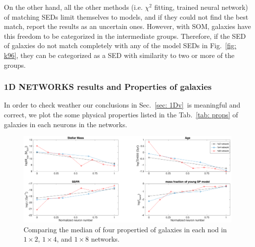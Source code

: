             On the other hand, all the other methods (i.e. $\chi^2$ fitting, trained neural network) of matching SEDs limit themselves to models, and if they could not find the best match, report the results as an uncertain ones.
            However, with SOM, galaxies have this freedom to be categorized in the intermediate groups.
            Therefore, if the SED of galaxies do not match completely with any of the model SEDs in Fig.~\ref{fig: k96}, they can be categorized as a SED with similarity to two or more of the groups.

                        
        
        
        \subsubsection{1D NETWORKS results and Properties of galaxies}
        In order to check weather our conclusions in Sec.~\ref{sec: 1Dv}~is meaningful and correct, we plot the some physical properties listed in the Tab.~\ref{tab: props} of galaxies in each neurons in the networks.
        
        \begin{figure}
            \centering
            \includegraphics[width=\textwidth]{../images0.01/1d/props3.png}
            \caption{Comparing the median of four propertied of galaxies in each nod in $1\times2$, $1\times4$, and $1\times8$ networks.}
            \label{fig: props}
        \end{figure}
        
        
       
